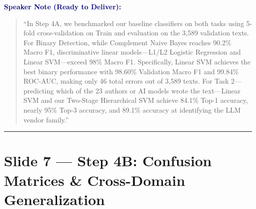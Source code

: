 \documentclass[11pt, a4paper]{article}
\newenvironment{speakernote}{%
    \par\vspace{0.2cm}%
    \noindent\textbf{\textcolor{navy}{Speaker Note (Ready to Deliver):}}\par\vspace{0.1cm}%
    \begin{quote}\itshape\color{slate}%
}{%
    \end{quote}\vspace{0.2cm}%
}
\begin{document}
\begin{speakernote}
``In Step 4A, we benchmarked our baseline classifiers on both tasks using 5-fold cross-validation on Train and evaluation on the 3,589 validation texts. For Binary Detection, while Complement Naive Bayes reaches 90.2\% Macro F1, discriminative linear models---L1/L2 Logistic Regression and Linear SVM---exceed 98\% Macro F1. Specifically, Linear SVM achieves the best binary performance with 98.60\% Validation Macro F1 and 99.84\% ROC-AUC, making only 46 total errors out of 3,589 texts. For Task 2---predicting which of the 23 authors or AI models wrote the text---Linear SVM and our Two-Stage Hierarchical SVM achieve 84.1\% Top-1 accuracy, nearly 95\% Top-3 accuracy, and 89.1\% accuracy at identifying the LLM vendor family.''
\end{speakernote}

\vspace{0.3cm}\hrule\vspace{0.3cm}

\section{Slide 7 --- Step 4B: Confusion Matrices \& Cross-Domain Generalization}
\end{document}
